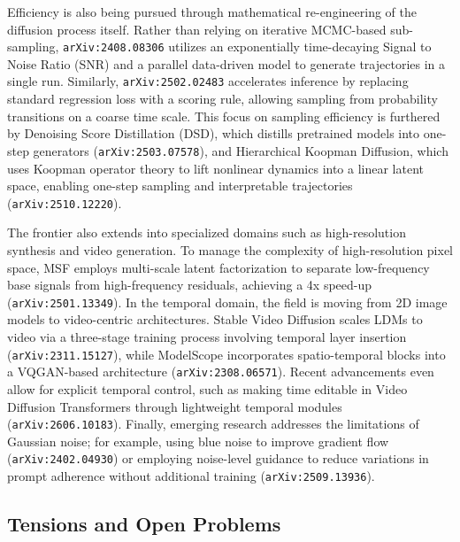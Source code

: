 \documentclass[11pt]{article}
\begin{document}
Efficiency is also being pursued through mathematical re-engineering of the diffusion process itself. Rather than relying on iterative MCMC-based sub-sampling, \texttt{arXiv:2408.08306} utilizes an exponentially time-decaying Signal to Noise Ratio (SNR) and a parallel data-driven model to generate trajectories in a single run. Similarly, \texttt{arXiv:2502.02483} accelerates inference by replacing standard regression loss with a scoring rule, allowing sampling from probability transitions on a coarse time scale. This focus on sampling efficiency is furthered by Denoising Score Distillation (DSD), which distills pretrained models into one-step generators (\texttt{arXiv:2503.07578}), and Hierarchical Koopman Diffusion, which uses Koopman operator theory to lift nonlinear dynamics into a linear latent space, enabling one-step sampling and interpretable trajectories (\texttt{arXiv:2510.12220}).

The frontier also extends into specialized domains such as high-resolution synthesis and video generation. To manage the complexity of high-resolution pixel space, MSF employs multi-scale latent factorization to separate low-frequency base signals from high-frequency residuals, achieving a 4x speed-up (\texttt{arXiv:2501.13349}). In the temporal domain, the field is moving from 2D image models to video-centric architectures. Stable Video Diffusion scales LDMs to video via a three-stage training process involving temporal layer insertion (\texttt{arXiv:2311.15127}), while ModelScope incorporates spatio-temporal blocks into a VQGAN-based architecture (\texttt{arXiv:2308.06571}). Recent advancements even allow for explicit temporal control, such as making time editable in Video Diffusion Transformers through lightweight temporal modules (\texttt{arXiv:2606.10183}). Finally, emerging research addresses the limitations of Gaussian noise; for example, using blue noise to improve gradient flow (\texttt{arXiv:2402.04930}) or employing noise-level guidance to reduce variations in prompt adherence without additional training (\texttt{arXiv:2509.13936}).

\subsection{Tensions and Open Problems}
\end{document}
